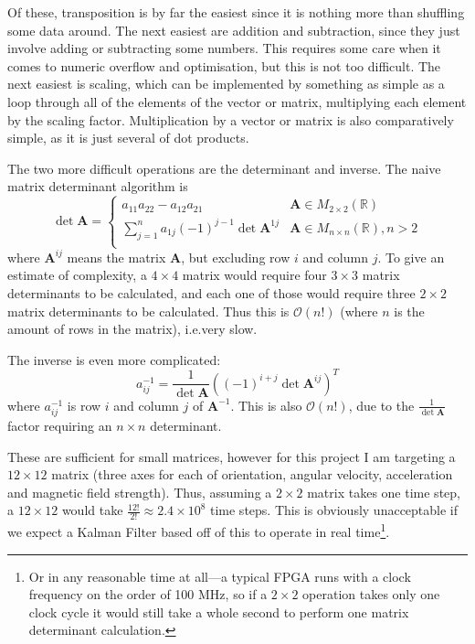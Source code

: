 \documentclass[12pt]{article}
\begin{document}
Of these, transposition is by far the easiest since it is nothing more than shuffling some data around. The next easiest are addition and subtraction, since they just involve adding or subtracting some numbers. This requires some care when it comes to numeric overflow and optimisation, but this is not too difficult. The next easiest is scaling, which can be implemented by something as simple as a loop through all of the elements of the vector or matrix, multiplying each element by the scaling factor. Multiplication by a vector or matrix is also comparatively simple, as it is just several of dot products.

The two more difficult operations are the determinant and inverse. The naive matrix determinant algorithm \cite{strang2006linear} is
\begin{equation}
	\det{\mathbf{A}} = 
	\begin{cases}
	a_{11}a_{22} - a_{12}a_{21}& \mathbf{A} \in M_{2 \times 2}(\mathbb{R})\\
	\sum_{j=1}^{n} a_{1j}  (-1)^{j-1}\det{\mathbf{A}^{1j}} & \mathbf{A} \in M_{n \times n}(\mathbb{R}), n > 2\\
	\end{cases}
\end{equation}
where $\mathbf{A}^{ij}$ means the matrix $\mathbf{A}$, but excluding row $i$ and column $j$. To give an estimate of complexity, a $4\times4$ matrix would require four $3\times3$ matrix determinants to be calculated, and each one of those would require three $2\times2$ matrix determinants to be calculated. Thus this is $\mathcal{O}(n!)$ (where $n$ is the amount of rows in the matrix), i.e.\@ very slow.

The inverse is even more complicated:
\begin{equation}
	a^{-1}_{ij} = \frac{1}{\det{\mathbf{A}}} \left((-1)^{i+j} \det{\mathbf{A}^{ij}}\right)^T
\end{equation}
where $a^{-1}_{ij}$ is row $i$ and column $j$ of $\mathbf{A}^{-1}$. This is also $\mathcal{O}(n!)$, due to the $\frac{1}{\det{\mathbf{A}}}$ factor requiring an $n \times n$ determinant.

These are sufficient for small matrices, however for this project I am targeting a $12 \times 12$ matrix (three axes for each of orientation, angular velocity, acceleration and magnetic field strength). Thus, assuming a $2\times2$ matrix takes one time step, a $12 \times 12$ would take $\frac{12!}{2!} \approx 2.4 \times 10^8$ time steps. This is obviously unacceptable if we expect a Kalman Filter based off of this to operate in real time\footnote{Or in any reasonable time at all---a typical FPGA runs with a clock frequency on the order of 100 MHz, so if a $2\times2$ operation takes only one clock cycle it would still take a whole second to perform one matrix determinant calculation.}.
\end{document}

